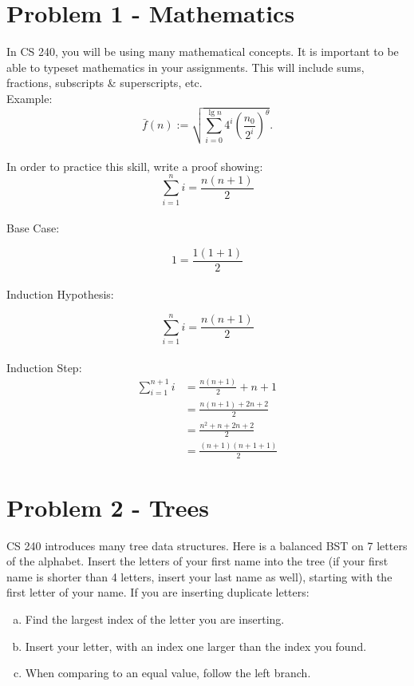 \documentclass[12pt]{article}
\begin{document}

\section*{Problem 1 - Mathematics}
In CS 240, you will be using many mathematical concepts. It is important to be able to typeset mathematics in your assignments. This will include sums, fractions, subscripts \& superscripts, etc. \\
Example: 
$$\bar{f}(n) := \sqrt {\sum_{i=0}^{\lg n} 4^i \left ( \frac{n_0}{2^i} \right )^{\theta}}.$$
\\
In order to practice this skill, write a proof showing: $$\sum_{i=1}^n i = \frac {n(n+1)} {2}$$
\\

Base Case:

$$1 = \frac{1(1+1)}{2}$$
\\

Induction Hypothesis:

$$\sum_{i=1}^n i = \frac {n(n+1)} {2}$$
\\
Induction Step:
\begin{align}
\sum_{i=1}^{n+1} i &= \frac {n(n+1)} {2} + n + 1\\
&= \frac {n(n+1) + 2n + 2} {2}\\
&= \frac {n^2 + n + 2n + 2} {2}\\
&= \frac {(n+1)(n+1+1)} {2}
\end{align}

\section*{Problem 2 - Trees}
CS 240 introduces many tree data structures. Here is a balanced BST on 7 letters of the
 alphabet. Insert the letters of your first name into the tree (if your first name is 
shorter than 4 letters, insert your last name as well), starting 
with the first letter of your name. If you are inserting duplicate
letters:


\begin{enumerate}[a)]
  \item Find the largest index of the letter you are inserting. 
  \item Insert your letter, with an index one larger than the index you found.
  \item When comparing to an equal value, follow the left branch.

\end{enumerate}
\end{document}
